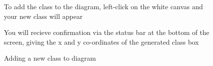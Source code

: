 \documentclass[a4paper]{article}
\begin{document}
\begin{figure}[H]
To add the class to the diagram, left-click on the white canvas and your new class will appear

\begin{center}
 \end{center}

You will recieve confirmation via the status bar at the bottom of the screen, giving the x and y co-ordinates of the generated class box
\caption{Adding a new class to diagram}
\vspace{-10pt}
\end{figure}
\newpage
\end{document}
